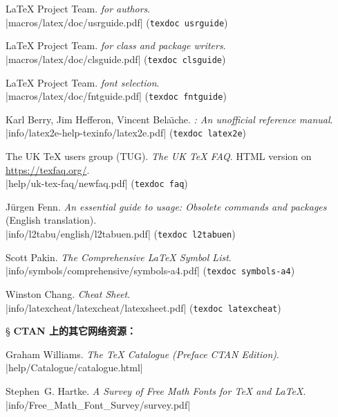 \begin{thebibliography}{20}
 \LaTeX{} Project Team.
  \newblock \emph{\LaTeXe{} for authors}.\\
  \CTAN|macros/latex/doc/usrguide.pdf| (\texttt{texdoc usrguide})

 \LaTeX{} Project Team.
  \newblock \emph{\LaTeXe{} for class and package writers}. \\
  \CTAN|macros/latex/doc/clsguide.pdf| (\texttt{texdoc clsguide})

 \LaTeX{} Project Team.
  \newblock \emph{\LaTeXe{} font selection}. \\
  \CTAN|macros/latex/doc/fntguide.pdf| (\texttt{texdoc fntguide})

 Karl Berry, Jim Hefferon, Vincent Bela\"{\i}che.
  \newblock \emph{\LaTeXe: An unofficial reference manual}. \\
  \CTAN|info/latex2e-help-texinfo/latex2e.pdf| (\texttt{texdoc latex2e})

 The UK TeX users group (TUG).
  \newblock \emph{The UK TeX FAQ}.
  \newblock HTML version on \url{https://texfaq.org/}. \\
  \CTAN|help/uk-tex-faq/newfaq.pdf| (\texttt{texdoc faq})

 J\"{u}rgen Fenn.
  \newblock \emph{An essential guide to \LaTeXe{} usage: Obsolete commands and packages} (English translation). \\
  \CTAN|info/l2tabu/english/l2tabuen.pdf| (\texttt{texdoc l2tabuen})

 Scott Pakin.
  \newblock \emph{The Comprehensive \LaTeX{} Symbol List}. \\
  \CTAN|info/symbols/comprehensive/symbols-a4.pdf| (\texttt{texdoc symbols-a4})

 Winston Chang.
  \newblock \emph{\LaTeXe{} Cheat Sheet}. \\
  \CTAN|info/latexcheat/latexcheat/latexsheet.pdf| (\texttt{texdoc latexcheat})

\item[\S] {\bfseries CTAN 上的其它网络资源：}

 Graham Williams.
  \newblock \emph{The \TeX{} Catalogue (Preface CTAN Edition)}.\\
  \CTAN|help/Catalogue/catalogue.html|

 Stephen~G. Hartke.
  \newblock \emph{A Survey of Free Math Fonts for \TeX{} and \LaTeX}.\\
  \CTAN|info/Free_Math_Font_Survey/survey.pdf|


\end{thebibliography}
